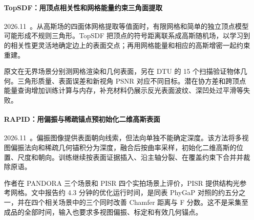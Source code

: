 \paragraph{TopSDF：用顶点相关性和网格能量约束三角面提取}
2026.11~\cite{2611_18708}。从高斯场的四面体网格提取等值面时，有限网格和简单的独立顶点模型可能形成不规则三角形。TopSDF 把顶点的符号距离联系成高斯随机场，以学习到的相关性更灵活地确定边上的表面交点；再用网格能量和相应的高斯增密一起约束重建。

原文在无界场景分别测网格渲染和几何表面，另在 DTU 的 15 个扫描验证物体几何。三角形质量、表面误差和新视角 PSNR 对应不同目标。潜在协方差和跨顶点能量查询增加训练计算与内存，补充材料仍展示反光表面波纹、深凹处过平滑等失败。

\paragraph{RAPID：用偏振与稀疏锚点预初始化二维高斯表面}
2026.11~\cite{2611_24404}。偏振图像提供表面朝向线索，但法向单独不能确定深度。该方法将多视图偏振法向和稀疏几何锚积分为深度，融合后按曲率采样，初始化二维高斯的位置、尺度和朝向。训练继续按表面证据插入、沿主轴分裂、在覆盖约束下合并并裁除原语。

作者在 PANDORA 三个场景和 PISR 四个实拍场景上评价，PISR 提供结构光参考网格。文中报告约 4.3 分钟的优化运行时间，是同表 PhyGaP 对照的约五分之一，并在四个相关场景中的三个同时改善 Chamfer 距离与 F 分数。这不是采集至成品的全部时间，输入也要求多视图偏振、标定和有效几何锚点。
